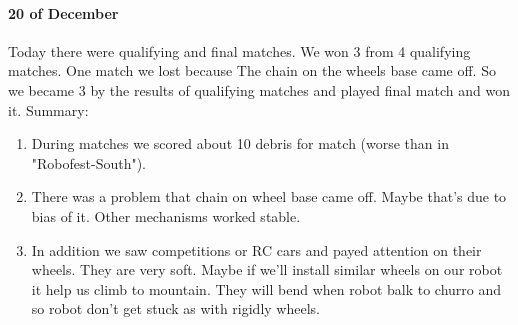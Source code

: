 \paragraph{20 of December}
Today there were qualifying and final matches.\newline
We won 3 from 4 qualifying matches. One match we lost because The chain on the wheels base came off. So we became 3 by the results of qualifying matches and played final match and won it.\newline
Summary:
\begin{enumerate}
	\item During matches we scored about 10 debris for match (worse than in "Robofest-South").
	
	\item There was a problem that chain on wheel base came off. Maybe that's due to bias of it. Other mechanisms worked stable.
	
	\item In addition we saw competitions or RC cars and payed attention on their wheels. They are very soft. Maybe if we'll install similar wheels on our robot it help us climb to mountain. They will bend when robot balk to churro and so robot don't get stuck as with rigidly wheels.  
\end{enumerate}
\fillpage